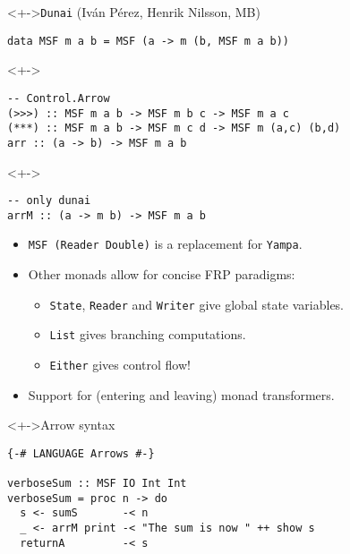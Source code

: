 \documentclass[handout]{enigtex-beamer-base}
\begin{document}
\begin{frame}[fragile]
\begin{block}<+->{\texttt{Dunai} (Iván Pérez, Henrik Nilsson, MB)}
\begin{verbatim}
data MSF m a b = MSF (a -> m (b, MSF m a b))
\end{verbatim}
\end{block}
\begin{block}<+->{}
\begin{verbatim}
-- Control.Arrow
(>>>) :: MSF m a b -> MSF m b c -> MSF m a c
(***) :: MSF m a b -> MSF m c d -> MSF m (a,c) (b,d)
arr :: (a -> b) -> MSF m a b
\end{verbatim}
\end{block}
\begin{block}<+->{}
\begin{verbatim}
-- only dunai
arrM :: (a -> m b) -> MSF m a b
\end{verbatim}
\end{block}
\begin{itemize}[<+->]
	\item \texttt{MSF (Reader Double)} is a replacement for \texttt{Yampa}.
	\item Other monads allow for concise FRP paradigms:
		\begin{itemize}[<+->]
			\item \texttt{State}, \texttt{Reader} and \texttt{Writer} give global state variables.
			\item \texttt{List} gives branching computations.
			\item \texttt{Either} gives control flow!
		\end{itemize}
	\item Support for (entering and leaving) monad transformers.
\end{itemize}
\end{frame}

\begin{frame}[fragile]
\begin{block}<+->{Arrow syntax}
\begin{verbatim}
{-# LANGUAGE Arrows #-}

verboseSum :: MSF IO Int Int
verboseSum = proc n -> do
  s <- sumS       -< n
  _ <- arrM print -< "The sum is now " ++ show s
  returnA         -< s
\end{verbatim}
\end{block}
\end{frame}
\end{document}
